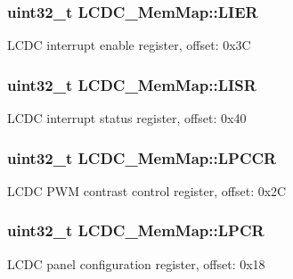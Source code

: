 \subsubsection[{L\+I\+E\+R}]{\setlength{\rightskip}{0pt plus 5cm}uint32\+\_\+t L\+C\+D\+C\+\_\+\+Mem\+Map\+::\+L\+I\+E\+R}\label{struct_l_c_d_c___mem_map_a602f30df3465d79b420243aaf1d51030}
L\+C\+D\+C interrupt enable register, offset\+: 0x3\+C \hypertarget{struct_l_c_d_c___mem_map_a567a030894ef2b7cf2c604d85946f3d4}{}
\subsubsection[{L\+I\+S\+R}]{\setlength{\rightskip}{0pt plus 5cm}uint32\+\_\+t L\+C\+D\+C\+\_\+\+Mem\+Map\+::\+L\+I\+S\+R}\label{struct_l_c_d_c___mem_map_a567a030894ef2b7cf2c604d85946f3d4}
L\+C\+D\+C interrupt status register, offset\+: 0x40 \hypertarget{struct_l_c_d_c___mem_map_a76b526a80deb41b702d98a8de996b9a6}{}
\subsubsection[{L\+P\+C\+C\+R}]{\setlength{\rightskip}{0pt plus 5cm}uint32\+\_\+t L\+C\+D\+C\+\_\+\+Mem\+Map\+::\+L\+P\+C\+C\+R}\label{struct_l_c_d_c___mem_map_a76b526a80deb41b702d98a8de996b9a6}
L\+C\+D\+C P\+W\+M contrast control register, offset\+: 0x2\+C \hypertarget{struct_l_c_d_c___mem_map_a0f61ba79429b1dbdfe3a3a98830393d9}{}
\subsubsection[{L\+P\+C\+R}]{\setlength{\rightskip}{0pt plus 5cm}uint32\+\_\+t L\+C\+D\+C\+\_\+\+Mem\+Map\+::\+L\+P\+C\+R}\label{struct_l_c_d_c___mem_map_a0f61ba79429b1dbdfe3a3a98830393d9}
L\+C\+D\+C panel configuration register, offset\+: 0x18 \hypertarget{struct_l_c_d_c___mem_map_ad2600d7c7ec0833a8b9089da675254b6}{}

